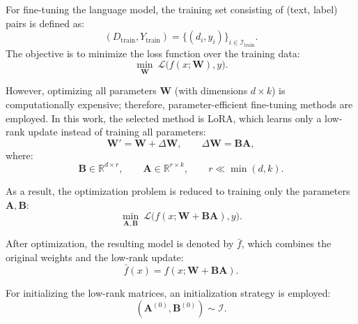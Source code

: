 \documentclass[a4paper,fleqn]{cas-sc}
\begin{document}
For fine-tuning the language model, the training set consisting of (text, label) pairs is defined as:
\begin{equation}
(D_{\text{train}},Y_{\text{train}})=\{(d_i,y_i)\}_{i\in\mathcal{I}_{\text{train}}}.
\end{equation}
The objective is to minimize the loss function over the training data:
\begin{equation}
\min_{\mathbf{W}} \ \mathcal{L}\big(f(x;\mathbf{W}), y\big).
\end{equation}

However, optimizing all parameters $\mathbf{W}$ (with dimensions $d\times k$) is computationally expensive; therefore, parameter-efficient fine-tuning methods are employed. In this work, the selected method is LoRA, which learns only a low-rank update instead of training all parameters:
\begin{equation}
\mathbf{W}'=\mathbf{W}+\Delta\mathbf{W}, \qquad \Delta\mathbf{W}=\mathbf{B}\mathbf{A},
\end{equation}
where:
\begin{equation}
\mathbf{B}\in\mathbb{R}^{d\times r}, \qquad \mathbf{A}\in\mathbb{R}^{r\times k}, \qquad r\ll \min(d,k).
\end{equation}

As a result, the optimization problem is reduced to training only the parameters $\mathbf{A},\mathbf{B}$:
\begin{equation}
\min_{\mathbf{A},\mathbf{B}} \ \mathcal{L}\big(f(x;\mathbf{W}+\mathbf{B}\mathbf{A}),y\big).
\end{equation}

After optimization, the resulting model is denoted by $\bar{f}$, which combines the original weights and the low-rank update:
\begin{equation}
\bar{f}(x)=f(x;\mathbf{W}+\mathbf{B}\mathbf{A}).
\end{equation}

For initializing the low-rank matrices, an initialization strategy is employed:
\begin{equation}
(\mathbf{A}^{(0)},\mathbf{B}^{(0)})\sim \mathcal{I}.
\end{equation}
\end{document}
